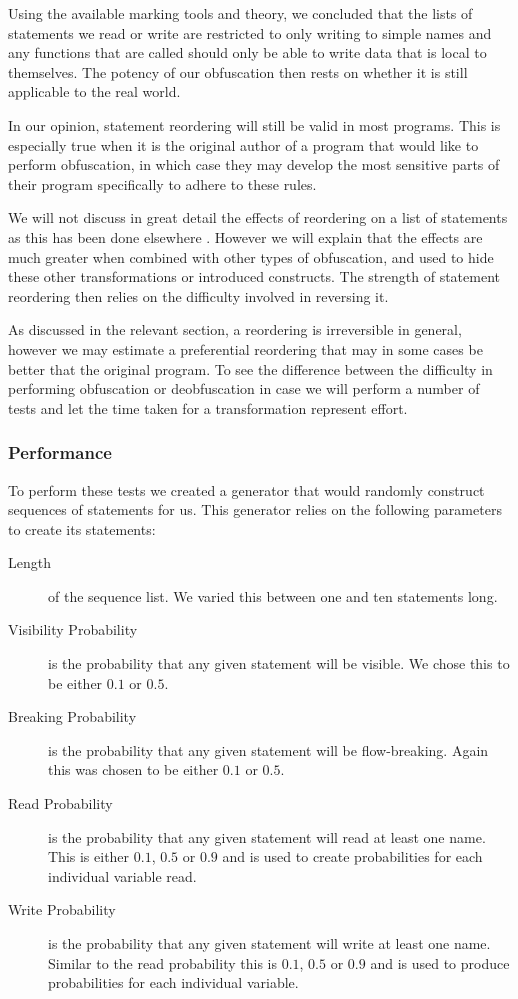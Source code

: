 \documentclass[twoside,a4paper]{report}
\begin{document}
Using the available marking tools and theory, we concluded that the lists of statements we read or write are restricted to only writing to simple names
and any functions that are called should only be able to write data that is local to themselves. The potency of our obfuscation then rests on whether
it is still applicable to the real world.

In our opinion, statement reordering will still be valid in most programs. This is especially true when it is the original author of a program that would
like to perform obfuscation, in which case they may develop the most sensitive parts of their program specifically to adhere to these rules.

We will not discuss in great detail the effects of reordering on a list of statements as this has been done elsewhere \cite{taxobftrans}. However we will
explain that the effects are much greater when combined with other types of obfuscation, and used to hide these other transformations or introduced constructs.
The strength of statement reordering then relies on the difficulty involved in reversing it.

As discussed in the relevant section, a reordering is irreversible in general, however we may estimate a preferential reordering that may in some cases be better
that the original program. To see the difference between the difficulty in performing obfuscation or deobfuscation in case we will perform a number of tests and
let the time taken for a transformation represent effort.

\subsubsection{Performance}

To perform these tests we created a generator that would randomly construct sequences of statements for us. This generator relies on the following
parameters to create its statements:

\begin{description}
\item[Length] of the sequence list. We varied this between one and ten statements long.
\item[Visibility Probability] is the probability that any given statement will be visible. We chose this to be either $0.1$ or $0.5$.
\item[Breaking Probability] is the probability that any given statement will be flow-breaking. Again this was chosen to be either $0.1$ or $0.5$.
\item[Read Probability] is the probability that any given statement will read at least one name. This is either $0.1$, $0.5$ or $0.9$ and is used to create
probabilities for each individual variable read.
\item[Write Probability] is the probability that any given statement will write at least one name. Similar to the read probability this is $0.1$, $0.5$ or $0.9$ and
is used to produce probabilities for each individual variable.
\end{description}
\end{document}

